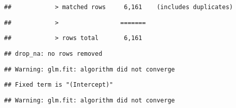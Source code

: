 \documentclass[
]{article}
\begin{document}
\begin{verbatim}
##            > matched rows     6,161    (includes duplicates)
\end{verbatim}

\begin{verbatim}
##            >                 =======
\end{verbatim}

\begin{verbatim}
##            > rows total       6,161
\end{verbatim}

\begin{verbatim}
## drop_na: no rows removed
\end{verbatim}

\begin{verbatim}
## Warning: glm.fit: algorithm did not converge
\end{verbatim}

\begin{verbatim}
## Fixed term is "(Intercept)"
\end{verbatim}

\begin{verbatim}
## Warning: glm.fit: algorithm did not converge
\end{verbatim}
\end{document}
